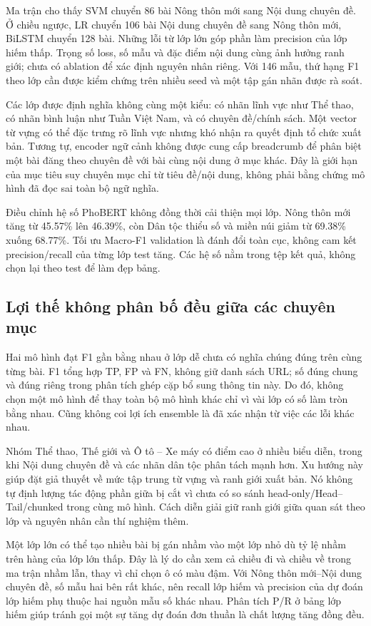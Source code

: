 Ma trận cho thấy SVM chuyển 86 bài Nông thôn mới sang Nội dung chuyên đề. Ở chiều ngược, LR chuyển 106 bài Nội dung chuyên đề sang Nông thôn mới, BiLSTM chuyển 128 bài. Những lỗi từ lớp lớn góp phần làm precision của lớp hiếm thấp. Trọng số loss, số mẫu và đặc điểm nội dung cùng ảnh hưởng ranh giới; chưa có ablation để xác định nguyên nhân riêng. Với 146 mẫu, thứ hạng F1 theo lớp cần được kiểm chứng trên nhiều seed và một tập gán nhãn được rà soát.


Các lớp được định nghĩa không cùng một kiểu: có nhãn lĩnh vực như Thể thao, có nhãn bình luận như Tuần Việt Nam, và có chuyên đề/chính sách. Một vector từ vựng có thể đặc trưng rõ lĩnh vực nhưng khó nhận ra quyết định tổ chức xuất bản. Tương tự, encoder ngữ cảnh không được cung cấp breadcrumb để phân biệt một bài đăng theo chuyên đề với bài cùng nội dung ở mục khác. Đây là giới hạn của mục tiêu suy chuyên mục chỉ từ tiêu đề/nội dung, không phải bằng chứng mô hình đã đọc sai toàn bộ ngữ nghĩa.

Điều chỉnh hệ số PhoBERT không đồng thời cải thiện mọi lớp. Nông thôn mới tăng từ 45.57\% lên 46.39\%, còn Dân tộc thiểu số và miền núi giảm từ 69.38\% xuống 68.77\%. Tối ưu Macro-F1 validation là đánh đổi toàn cục, không cam kết precision/recall của từng lớp test tăng. Các hệ số nằm trong tệp kết quả, không chọn lại theo test để làm đẹp bảng.



\subsection{Lợi thế không phân bố đều giữa các chuyên mục}
Hai mô hình đạt F1 gần bằng nhau ở lớp dễ chưa có nghĩa chúng đúng trên cùng từng bài. F1 tổng hợp TP, FP và FN, không giữ danh sách URL; số đúng chung và đúng riêng trong phân tích ghép cặp bổ sung thông tin này. Do đó, không chọn một mô hình để thay toàn bộ mô hình khác chỉ vì vài lớp có số làm tròn bằng nhau. Cũng không coi lợi ích ensemble là đã xác nhận từ việc các lỗi khác nhau.

Nhóm Thể thao, Thế giới và Ô tô -- Xe máy có điểm cao ở nhiều biểu diễn, trong khi Nội dung chuyên đề và các nhãn dân tộc phân tách mạnh hơn. Xu hướng này giúp đặt giả thuyết về mức tập trung từ vựng và ranh giới xuất bản. Nó không tự định lượng tác động phần giữa bị cắt vì chưa có so sánh head-only/Head--Tail/chunked trong cùng mô hình. Cách diễn giải giữ ranh giới giữa quan sát theo lớp và nguyên nhân cần thí nghiệm thêm.

Một lớp lớn có thể tạo nhiều bài bị gán nhầm vào một lớp nhỏ dù tỷ lệ nhầm trên hàng của lớp lớn thấp. Đây là lý do cần xem cả chiều đi và chiều về trong ma trận nhầm lẫn, thay vì chỉ chọn ô có màu đậm. Với Nông thôn mới--Nội dung chuyên đề, số mẫu hai bên rất khác, nên recall lớp hiếm và precision của dự đoán lớp hiếm phụ thuộc hai nguồn mẫu số khác nhau. Phân tích P/R ở bảng lớp hiếm giúp tránh gọi một sự tăng dự đoán đơn thuần là chất lượng tăng đồng đều.


